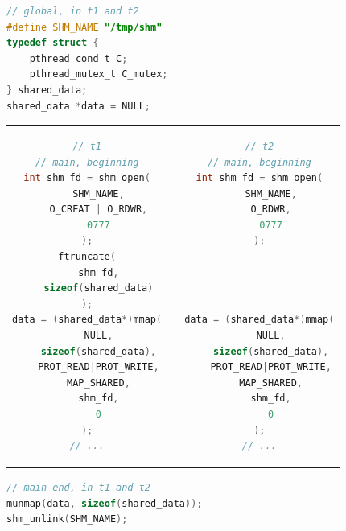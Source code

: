 \documentclass{sope}
\begin{document}
\begin{lstlisting}[language=C]
// global, in t1 and t2
#define SHM_NAME "/tmp/shm"
typedef struct {
    pthread_cond_t C;
    pthread_mutex_t C_mutex;
} shared_data;
shared_data *data = NULL;
\end{lstlisting}
\begin{center}
    \begin{tabular}{c c c}
        \begin{minipage}{73mm}\begin{lstlisting}[language=C]
// t1
// main, beginning
int shm_fd = shm_open(
    SHM_NAME,
    O_CREAT | O_RDWR,
    0777
);
ftruncate(
    shm_fd,
    sizeof(shared_data)
);
data = (shared_data*)mmap(
    NULL,
    sizeof(shared_data),
    PROT_READ|PROT_WRITE,
    MAP_SHARED,
    shm_fd,
    0
);
// ...
        \end{lstlisting}\end{minipage} & &
        \begin{minipage}{73mm}\begin{lstlisting}[language=C]
// t2
// main, beginning
int shm_fd = shm_open(
    SHM_NAME,
    O_RDWR,
    0777
);




data = (shared_data*)mmap(
    NULL,
    sizeof(shared_data),
    PROT_READ|PROT_WRITE,
    MAP_SHARED,
    shm_fd,
    0
);
// ...
        \end{lstlisting}\end{minipage}
    \end{tabular}
\end{center}
\begin{lstlisting}[language=C]
// main end, in t1 and t2
munmap(data, sizeof(shared_data));
shm_unlink(SHM_NAME);
\end{lstlisting}
\end{document}
